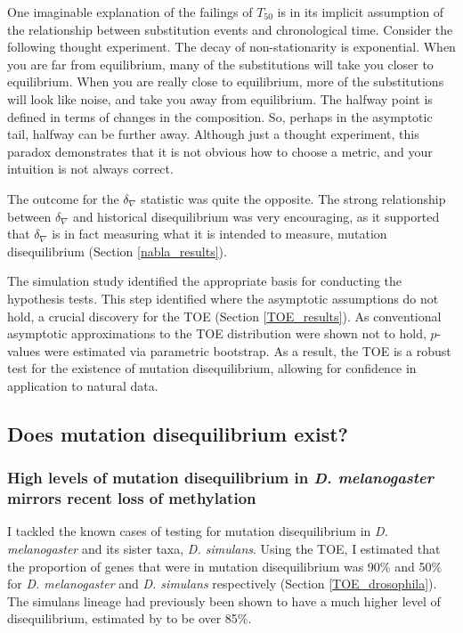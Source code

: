 One imaginable explanation of the failings of $T_{50}$ is in its implicit assumption of the relationship between substitution events and chronological time. Consider the following thought experiment. The decay of non-stationarity is exponential. When you are far from equilibrium, many of the substitutions will take you closer to equilibrium. When you are really close to equilibrium, more of the substitutions will look like noise, and take you away from equilibrium. The halfway point is defined in terms of changes in the composition. So, perhaps in the asymptotic tail, halfway can be further away. Although just a thought experiment, this paradox demonstrates that it is not obvious how to choose a metric, and your intuition is not always correct. 

The outcome for the $\delta_\nabla$ statistic was quite the opposite. The strong relationship between $\delta_\nabla$ and historical disequilibrium was very encouraging, as it supported that $\delta_\nabla$ is in fact measuring what it is intended to measure, mutation disequilibrium (Section \ref{nabla_results}).

The simulation study identified the appropriate basis for conducting the hypothesis tests. This step identified where the asymptotic assumptions do not hold, a crucial discovery for the TOE (Section \ref{TOE_results}). As conventional asymptotic approximations to the TOE distribution were shown not to hold, $p$-values were estimated via parametric bootstrap. As a result, the TOE is a robust test for the existence of mutation disequilibrium, allowing for confidence in application to natural data. 

\subsection{Does mutation disequilibrium exist?}

\subsubsection{High levels of mutation disequilibrium in \textit{D. melanogaster} mirrors recent loss of methylation}
I tackled the known cases of testing for mutation disequilibrium in \textit{D. melanogaster} and its sister taxa, \textit{D. simulans}. Using the TOE, I estimated that the proportion of genes that were in mutation disequilibrium was 90\% and 50\% for \textit{D. melanogaster} and \textit{D. simulans} respectively (Section \ref{TOE_drosophila}).  The simulans lineage had previously been shown to have a much higher level of disequilibrium, estimated by \cite{Squartini2008QuantifyingProcess} to be over 85\%. 

